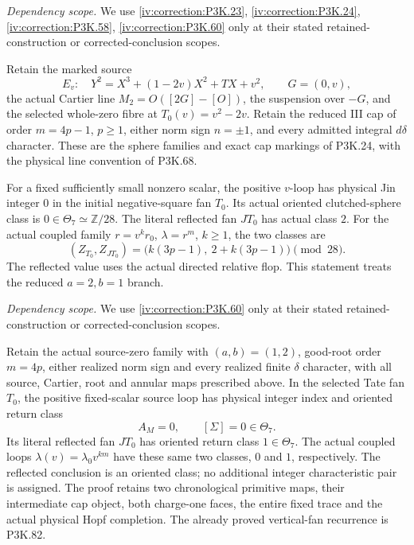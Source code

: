 \begin{theorem}\hypertarget{tag-02VT}{}\label{night:P3K.80}

\par\noindent\textit{Dependency scope.} We use \cref{iv:correction:P3K.23}, \cref{iv:correction:P3K.24}, \cref{iv:correction:P3K.58}, \cref{iv:correction:P3K.60} only at their stated retained-construction or corrected-conclusion scopes.


Retain the marked source
\[
 E_v:\quad Y^2=X^3+(1-2v)X^2+TX+v^2,\qquad G=(0,v),
\]
the actual Cartier line \(M_2=O([2G]-[O])\), the suspension
over \(-G\), and the selected whole-zero fibre at
\(T_0(v)=v^2-2v\). Retain the reduced III cap of order
\(m=4p-1\), \(p\ge1\), either norm sign \(n=\pm1\),
and every admitted integral \(d\delta\) character. These
are the sphere families and exact cap markings of P3K.24,
with the physical line convention of P3K.68.

For a fixed sufficiently small nonzero scalar, the positive
\(v\)-loop has physical Jin integer \(0\) in the initial
negative-square fan \(T_0\). Its actual oriented clutched-sphere
class is \(0\in\Theta_7\simeq\mathbb Z/28\). The literal
reflected fan \(JT_0\) has actual class \(2\). For the
actual coupled family \(r=v^k r_0\), \(\lambda=r^m\),
\(k\ge1\), the two classes are
\[
 (Z_{T_0},Z_{JT_0})
   =\bigl(k(3p-1),\ 2+k(3p-1)\bigr)\pmod {28}.
 \tag{P3K.80.RA.1}
\]
The reflected value uses the actual directed relative flop.
This statement treats the reduced \(a=2,b=1\) branch.
\end{theorem}

\begin{theorem}\hypertarget{tag-02VW}{}\label{night:P3K.83}

\par\noindent\textit{Dependency scope.} We use \cref{iv:correction:P3K.60} only at their stated retained-construction or corrected-conclusion scopes.


Retain the actual source-zero family with
\((a,b)=(1,2)\), good-root order \(m=4p\), either realized norm
sign and every realized finite \(\delta\) character, with all source,
Cartier, root and annular maps prescribed above. In the selected
Tate fan \(T_0\), the positive fixed-scalar source loop has physical
integer index and oriented return class
\[
                         A_M=0,\qquad [\Sigma]=0\in\Theta_7.
\]
Its literal reflected fan \(JT_0\) has oriented return class
\(1\in\Theta_7\). The actual coupled loops
\(\lambda(v)=\lambda_0v^{km}\) have these same two classes,
\(0\) and \(1\), respectively. The reflected conclusion is an
oriented class; no additional integer characteristic pair is
assigned. The proof retains two chronological primitive maps,
their intermediate cap object, both charge-one faces, the entire
fixed trace and the actual physical Hopf completion. The already
proved vertical-fan recurrence is P3K.82.
\end{theorem}

